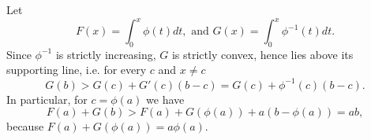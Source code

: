 \documentclass[12pt]{article}
\begin{document}
Let 
$$F(x)=\int_0^x \phi(t)dt, \text{   and   } G(x)=\int_0^x \phi^{-1}(t)dt.$$
Since $\phi^{-1}$ is strictly increasing, $G$ is strictly convex, hence lies above its supporting line, i.e. for every $c$ and $x\neq c$
$$G(b)> G(c)+G'(c)(b-c)=G(c)+ \phi^{-1}(c)(b-c).$$
In particular, for $c=\phi(a)$ we have
$$F(a)+G(b)>F(a)+G(\phi(a))+a(b-\phi(a))=ab,$$
because $F(a)+G(\phi(a))=a\phi(a)$.
\end{document}
